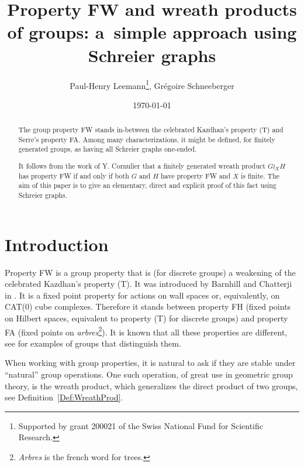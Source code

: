 \documentclass[a4paper]{article}
\title{Property FW and wreath products of groups: a~simple approach using Schreier graphs}
\author{Paul-Henry Leemann\thanks{Supported by grant 200021\textunderscore188578 of the Swiss National Fund for Scientific Research.}, Grégoire Schneeberger}
\date{\today}
\theoremstyle{definition}
\theoremstyle{remark}
\begin{document}
\maketitle
%
%
%
%
\begin{abstract}
The group property FW stands in-between the celebrated Kazdhan's property (T) and Serre's property FA. Among many characterizations, it might be defined, for finitely generated groups, as having all Schreier graphs one-ended.

It follows from the work of Y. Cornulier that a finitely generated wreath product $G\wr_XH$ has property FW if and only if both $G$ and $H$ have property FW and $X$ is finite.
The aim of this paper is to give an elementary, direct and explicit proof of this fact using Schreier graphs.
\end{abstract}
%
%
%
%
\section{Introduction}
Property FW is a group property that is (for discrete groups) a weakening of the celebrated Kazdhan's property (T). It was introduced by Barnhill and Chatterji in \cite{Barnhill2008}. It is a fixed point property for actions on wall spaces or, equivalently, on CAT(0) cube complexes. Therefore it stands between property FH (fixed points on Hilbert spaces, equivalent to property (T) for discrete groups) and property FA (fixed points on \emph{arbres}\footnote{\emph{Arbres} is the french word for trees.}). It is known that all these properties are different, see  \cite{Cornulier2013} for examples of groups that distinguish them.

When working with group properties, it is natural to ask if they are stable under ``natural'' group operations. One such operation, of great use in geometric group theory, is the wreath product, which generalizes the direct product of two groups, see Definition~\ref{Def:WreathProd}.
\end{document}
